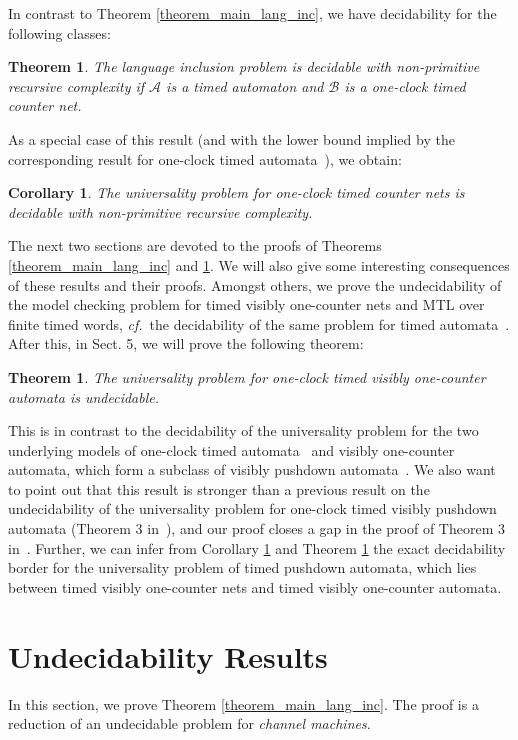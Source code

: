 \documentclass{CSML}
\theoremstyle{plain}\newtheorem{theorem}[thm]{Theorem}
\theoremstyle{plain}\newtheorem{corollary}[thm]{Corollary}
\theoremstyle{plain}\newtheorem{example}[thm]{Example}
\theoremstyle{plain}\newtheorem{lemma}[thm]{Lemma}
\theoremstyle{plain}\newtheorem{remark}[thm]{Remark}
\def\cf{{\em cf.}}
\newcommand{\B}{\mathcal{B}}
\newcommand{\A}{\mathcal{A}}
\begin{document}
	In contrast to Theorem \ref{theorem_main_lang_inc}, 
	we have decidability for the following classes: 
\begin{theorem}
		\label{theorem_main_dec}
		The language inclusion problem is decidable with non-primitive recursive complexity if $\A$ is a timed automaton and $\B$ is a one-clock timed counter net.
	\end{theorem}
	As a special case of this result (and with the lower bound implied by the corresponding result for one-clock timed automata~\cite{DBLP:journals/fuin/AbdullaDOQW08}), we obtain:
	\begin{corollary}
		\label{corollary_univ_dec}
		The universality problem for one-clock timed counter nets is decidable with non-primitive recursive complexity.
	\end{corollary}
	The next two sections are devoted to the proofs of Theorems \ref{theorem_main_lang_inc} and \ref{theorem_main_dec}. 
	We will also give some interesting consequences of these results and their proofs. 
	Amongst others, we prove the undecidability of the model checking problem for timed visibly one-counter nets and MTL over finite timed words, \cf \ the decidability of the same problem for timed automata~\cite{DBLP:conf/lics/OuaknineW05}. 
	After this, in Sect. 5, we will prove the following theorem:
	\begin{theorem}
		\label{theorem_univ_undec}
		The universality problem for one-clock timed visibly one-counter automata is undecidable.
	\end{theorem}
	This is in contrast to the decidability of the universality problem for the two underlying models of one-clock timed automata~\cite{DBLP:conf/lics/OuaknineW04} and visibly one-counter automata, which form a subclass of visibly pushdown automata~\cite{DBLP:conf/stoc/AlurM04}.  
	We also want to point out that this result 
	is stronger than a previous result on the undecidability of the universality problem for one-clock timed visibly pushdown automata (Theorem 3 in~\cite{EmmiM06}), and our proof closes a gap in the proof of Theorem 3 in~\cite{EmmiM06}. 
	Further, we can infer from Corollary \ref{corollary_univ_dec} and Theorem \ref{theorem_univ_undec} the exact decidability border for the universality problem of timed pushdown automata, which lies between timed visibly one-counter nets and timed visibly one-counter automata. 
	
	
	
	\section{Undecidability Results}
	In this section, we prove Theorem \ref{theorem_main_lang_inc}. 
	The proof is a reduction of an undecidable  problem for \emph{channel machines}. 
	
\end{document}
